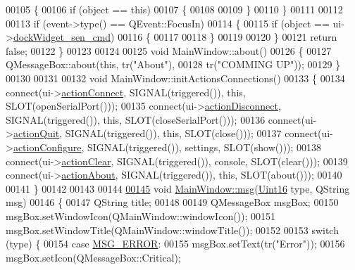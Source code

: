 \begin{DoxyCode}
00105     \{
00106         \textcolor{keywordflow}{if} (\textcolor{keywordtype}{object} == \textcolor{keyword}{this})
00107         \{
00108 
00109         \}
00110     \}
00111 
00112 
00113     \textcolor{keywordflow}{if} (event->type() == QEvent::FocusIn)
00114     \{
00115         \textcolor{keywordflow}{if} (\textcolor{keywordtype}{object} == ui->\hyperlink{a00027_a9eb86a5ee396766f0f4a65f2d2bd7688}{dockWidget\_sen\_cmd})
00116         \{
00117 
00118         \}
00119 
00120     \}
00121     \textcolor{keywordflow}{return} \textcolor{keyword}{false};
00122 \}
00123 
00124 
00125 \textcolor{keywordtype}{void} MainWindow::about()
00126 \{
00127     QMessageBox::about(\textcolor{keyword}{this}, tr(\textcolor{stringliteral}{"About"}),
00128                        tr(\textcolor{stringliteral}{"COMMING UP"}));
00129 \}
00130 
00131 
00132 \textcolor{keywordtype}{void} MainWindow::initActionsConnections()
00133 \{
00134     connect(ui->\hyperlink{a00027_aa0785566311fc48271690fb68b1d4c5f}{actionConnect}, SIGNAL(triggered()), \textcolor{keyword}{this}, SLOT(openSerialPort()));
00135     connect(ui->\hyperlink{a00027_a8a16b3aef75b279eaaa887152d2f746b}{actionDisconnect}, SIGNAL(triggered()), \textcolor{keyword}{this}, SLOT(closeSerialPort()));
00136     connect(ui->\hyperlink{a00027_a188c243f36a2dbc10e4e2a0ad94273b1}{actionQuit}, SIGNAL(triggered()), \textcolor{keyword}{this}, SLOT(close()));
00137     connect(ui->\hyperlink{a00027_a3860abde3cfd3f6170e28fddde73f11e}{actionConfigure}, SIGNAL(triggered()), settings, SLOT(show()));
00138     connect(ui->\hyperlink{a00027_ac8539dcd87955047877cb256aff60453}{actionClear}, SIGNAL(triggered()), console, SLOT(clear()));
00139     connect(ui->\hyperlink{a00027_abdf2b43167c2cd0d3405f90b8c30e934}{actionAbout}, SIGNAL(triggered()), \textcolor{keyword}{this}, SLOT(about()));
00140 
00141 \}
00142 
00143 
00144 
\hypertarget{a00038_source_l00145}{}\hyperlink{a00006_a6134b74dbfffbaf333e169bd09597b53}{00145} \textcolor{keywordtype}{void} \hyperlink{a00006_a6134b74dbfffbaf333e169bd09597b53}{MainWindow::msg}(\hyperlink{a00001_aae7407b021d43f7193a81a58cfb3e297}{Uint16} type, QString msg)
00146 \{
00147     QString title;
00148 
00149     QMessageBox msgBox;
00150     msgBox.setWindowIcon(QMainWindow::windowIcon());
00151     msgBox.setWindowTitle(QMainWindow::windowTitle());
00152 
00153     \textcolor{keywordflow}{switch} (type) \{
00154     \textcolor{keywordflow}{case} \hyperlink{a00034_aa8a990825a5a62c89d2fb8b08d8a1070}{MSG\_ERROR}:
00155         msgBox.setText(tr(\textcolor{stringliteral}{"Error"}));
00156         msgBox.setIcon(QMessageBox::Critical);

\end{DoxyCode}
